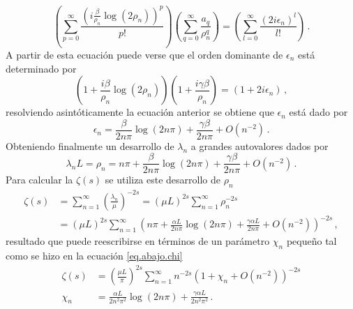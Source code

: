 \begin{equation}
    \left(
    \sum _{p = 0} ^{\infty} \frac{ \left( i \frac{\beta}{ \rho _n } \log(2 \rho _n ) \right) ^p }{p!}
    \right)
    \left(
	\sum _{q = 0} ^{\infty} \frac{a _q}{\rho _n ^q}
	\right)
    =
    \left(
    \sum _{l = 0} ^{\infty} \frac{( 2 i \epsilon _n)^l}{l !}
    \right)
    	\, .
\end{equation}
A partir de esta ecuación puede verse que el orden dominante de $\epsilon _n$ está determinado por
\begin{equation}
\left( 1 + \frac{i \beta}{ \rho _n} \log ( 2 \rho _n) \right) 
\left(1 + \frac{i  \gamma \beta}{ \rho _n} \right)  =
(1 + 2 i \epsilon _n) \, ,
\end{equation}
resolviendo asintóticamente la ecuación anterior se obtiene que $\epsilon _n$ está dado por 
\begin{equation}\label{anterior}
    \epsilon _n =  \frac{\beta }{2 n \pi} \log (2 n \pi) +
                \frac{\gamma \beta}{2 n \pi} +
                O\left(  n^{-2} \right)
                	\, .
\end{equation}
Obteniendo finalmente un desarrollo de  $\lambda _n$ a grandes autovalores dados por
\begin{equation}
	\lambda _n L= 
	\rho _n = 
	n \pi
	+ \frac{\beta }{2 n \pi} \log (2 n \pi)
	+ \frac{\gamma \beta}{2 n \pi}
	+ O ( n^{-2} )
\, .
\end{equation}
Para calcular la $\zeta (s)$ se utiliza este desarrollo de $\rho _n$
\begin{equation*}
\begin{aligned}
    \zeta (s) &= \sum _{n=1} ^{\infty} \left( \frac{\lambda _n}{\mu} \right) ^{-2 s}  
    = ( \mu L) ^{2 s} \sum _{n=1} ^{\infty}  \rho _n  ^{-2 s}  \\
    & =    ( \mu L) ^{2 s} \sum _{n=1} ^{\infty} 
    \left( 
    n \pi + \frac{\alpha L }{2 n \pi} \log (2 n \pi) + \frac{\gamma \alpha L}{2 n \pi} +
    O \left( n^{-2} \right)
    \right) ^{-2s}
    	\, ,
\end{aligned}
\end{equation*}
resultado que puede reescribirse en términos de un parámetro $\chi _n$ pequeño tal como se hizo en la ecuación \eqref{eq.abajo.chi}
\begin{equation}
\begin{aligned}
    \zeta  (s) &= \left( \frac{\mu L }{\pi} \right)  ^{2 s} 
    \sum _{n=1} ^{\infty} n ^{- 2  s} 
    \left(
    	1 + \chi _n  + O( n^{-2} )
    	\right) ^{-2 s} \\[5pt]
		 \chi _n &= 
    	\frac{\alpha L  }{2 n^2 \pi ^2} \log (2 n \pi) + 
    	\frac{\gamma \alpha L}{2 n^2 \pi ^2 }  
    			\, .
\end{aligned}
\end{equation}

